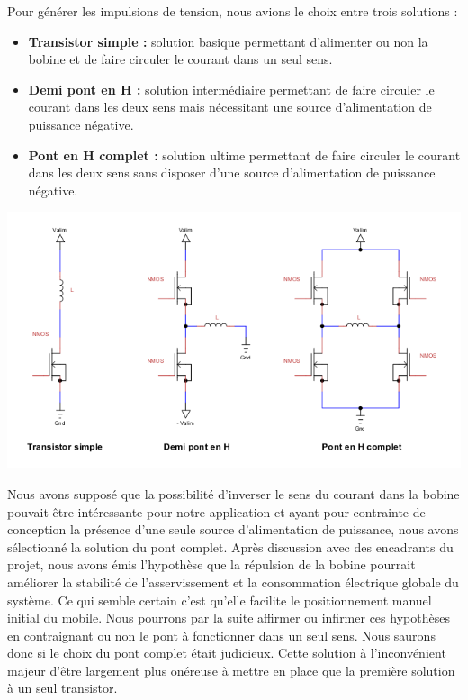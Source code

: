 \documentclass[11pt, french]{article} %
\begin{document}
\medskip
\noindent
Pour générer les impulsions de tension, nous avions le choix entre trois solutions :

\medskip
\begin{itemize}
	\item \textbf{Transistor simple :} solution basique permettant d'alimenter ou non la bobine et de faire circuler le courant dans un seul sens.
	\item \textbf{Demi pont en H :} solution intermédiaire permettant de faire circuler le courant dans les deux sens mais nécessitant une source d'alimentation de puissance négative.
	\item \textbf{Pont en H complet :} solution ultime permettant de faire circuler le courant dans les deux sens sans disposer d'une source d'alimentation de puissance négative.
\end{itemize}

\begin{center}
\includegraphics[width = 15cm]{SolutionAnalogique/Ponts.png} 
\end{center}

\medskip
Nous avons supposé que la possibilité d'inverser le sens du courant dans la bobine pouvait être intéressante pour notre application et ayant pour contrainte de conception la présence d'une seule source d'alimentation de puissance, nous avons sélectionné la solution du pont complet. Après discussion avec des encadrants du projet, nous avons émis l'hypothèse que la répulsion de la bobine pourrait améliorer la stabilité de l'asservissement et la consommation électrique globale du système. Ce qui semble certain c'est qu'elle facilite le positionnement manuel initial du mobile. Nous pourrons par la suite affirmer ou infirmer ces hypothèses en contraignant ou non le pont à fonctionner dans un seul sens. Nous saurons donc si le choix du pont complet était judicieux. Cette solution à l'inconvénient majeur d'être largement plus onéreuse à mettre en place que la première solution à un seul transistor.
\end{document}
